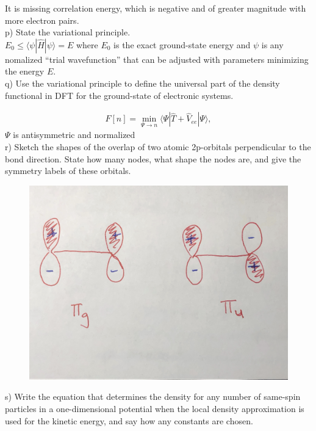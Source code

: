 \documentclass{article}
\begin{document}
{\color{blue} It is missing correlation energy, which is negative and
  of greater magnitude with more electron pairs.
}
\\

\noindent p) State the variational principle.
\\

{\color{blue} $E_0 \leq \langle\psi|\hat{H}|\psi\rangle = E$ where $E_0$ is the exact
  ground-state energy and $\psi$ is any nomalized ``trial wavefunction'' that can be adjusted with
  parameters minimizing the energy $E$.
}\\

\noindent q) Use the variational principle to define the universal part of the density
functional in DFT for the ground-state of electronic systems.

{\color{blue}
  \begin{align*}
    F[n] = \min_{\Psi\rightarrow n}\langle \Psi|\hat{T} + \hat{V}_{ee}|\Psi\rangle,
  \end{align*}
  $\Psi$ is antisymmetric and normalized
}\\

\noindent r) Sketch the shapes of the overlap of two atomic 2p-orbitals perpendicular
to the bond direction. State how many nodes, what shape the nodes are, and give the
symmetry labels of these orbitals.
\\

\begin{figure}[H]
  \centering
  \includegraphics[scale=0.07]{p.jpg}
\end{figure}

\noindent s) Write the equation that determines the density for any number of same-spin
particles in a one-dimensional potential when the local density approximation is used
for the kinetic energy, and say how any constants are chosen.
\\
\end{document}
